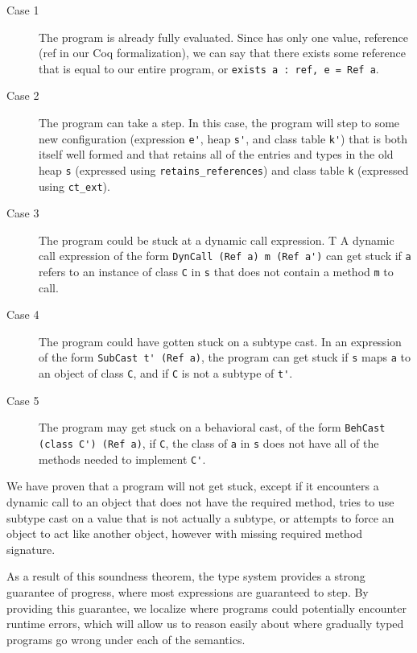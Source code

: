 \documentclass{tex/llncs}
\begin{document}
\begin{description}
  \item[Case 1] The program is already fully evaluated. Since \kafka has only one value,
  reference (ref in our Coq formalization), we can say that there exists some
  reference that is equal to our entire program, or \verb|exists a : ref, e = Ref a|.

  \item[Case 2] The program can take a step. In this case, the program will
step to some new configuration (expression \verb|e'|, heap \verb|s'|, and
class table \verb|k'|) that is both itself well formed and that retains all of
the entries and types in the old heap \verb|s| (expressed using
\verb|retains_references|) and class table \verb|k| (expressed using \verb|ct_ext|).

  \item[Case 3] The program could be stuck at a dynamic call expression. T
  A dynamic call expression of the form \verb|DynCall (Ref a) m (Ref a')| can get 
  stuck if \verb|a| refers to an instance of class \verb|C| in \verb|s| 
  that does not contain a method \verb|m| to call. 
  
  \item[Case 4] The program could have gotten stuck on a subtype cast. 
  In an expression of the form \verb|SubCast t' (Ref a)|, the program
  can get stuck if \verb|s| maps \verb|a| to an object of class \verb|C|,
  and if \verb|C| is not a subtype of \verb|t'|.

  \item[Case 5] The program may get stuck on a behavioral cast, of the form
\verb|BehCast| \verb|(class C') (Ref a)|, if \verb|C|, the class of \verb|a| in
\verb|s| does not have all of the methods needed to implement \verb|C'|.
\end{description}

We have proven that a \kafka program will not get stuck, except if it
encounters a dynamic call to an object that does not have the required method,
tries to use subtype cast on a value that is not actually a subtype, or attempts
to force an object to act like another object, however with missing required 
method signature. 

As a result of this soundness theorem, the \kafka type system provides a
strong guarantee of progress, where most expressions are guaranteed to step.
By providing this guarantee, we localize where \kafka programs could
potentially encounter runtime errors, which will allow us to reason easily
about where gradually typed programs go wrong under each of the semantics.
\end{document}
